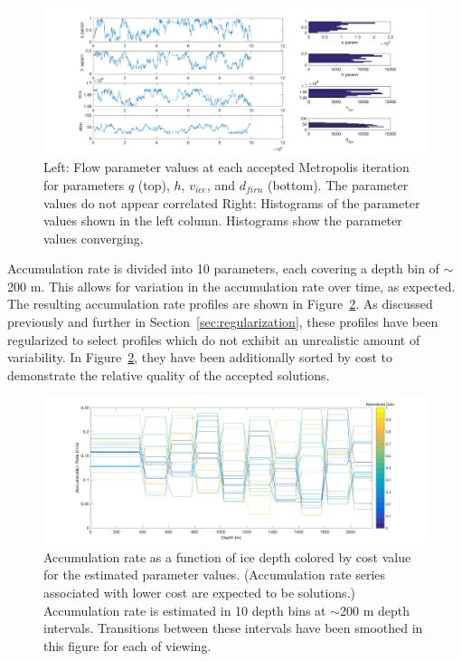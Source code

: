 \begin{figure}[ht]
\centering
\includegraphics[scale=0.3]{../analysis/figures/convergence1}
\caption[]{Left: Flow parameter values at each accepted Metropolis iteration for parameters $q$ (top), $h$, $v_{ice}$, and $d_{firn}$ (bottom). The parameter values do not appear correlated Right: Histograms of the parameter values shown in the left column. Histograms show the parameter values converging.}
\label{fig:flowparamconvergence}
\end{figure}

Accumulation rate is divided into 10 parameters, each covering a depth bin of $\sim$200 m. This allows for variation in the accumulation rate over time, as expected. The resulting accumulation rate profiles are shown in Figure~\ref{fig:accumdepth}. As discussed previously and further in Section~\ref{sec:regularization}, these profiles have been regularized to select profiles which do not exhibit an unrealistic amount of variability. In Figure~\ref{fig:accumdepth}, they have been additionally sorted by cost to demonstrate the relative quality of the accepted solutions.

\begin{figure}[ht]
\centering
\includegraphics[scale=0.3]{../analysis/figures/accumdepthSorted}
\caption[]{Accumulation rate as a function of ice depth colored by cost value for the estimated parameter values. (Accumulation rate series associated with lower cost are expected to be solutions.) Accumulation rate is estimated in 10 depth bins at $\sim$200 m depth intervals. Transitions between these intervals have been smoothed in this figure for each of viewing.}
\label{fig:accumdepth}
\end{figure}

